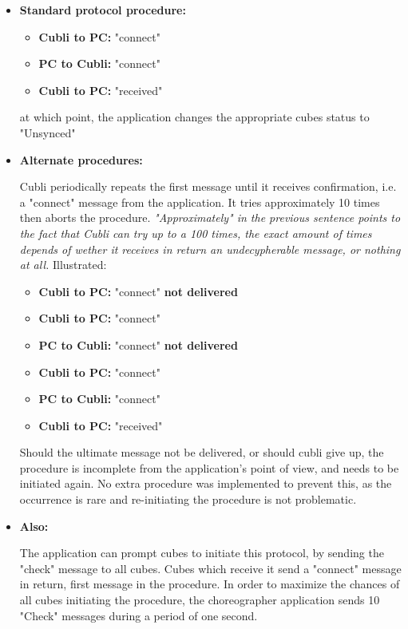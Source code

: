 \begin{itemize}
\item[] \textbf{Standard protocol procedure:}

\begin{itemize}
\item[] \textbf{Cubli to PC:} "connect"
\item[] \textbf{PC to Cubli:} "connect"
\item[] \textbf{Cubli to PC:} "received"
\end{itemize}

at which point, the application changes the appropriate cubes status to "Unsynced"\\

\item[] \textbf{Alternate procedures:}

Cubli periodically repeats the first message until it receives confirmation, i.e. a "connect" message from the application. It tries approximately 10 times then aborts the procedure. \textit{"Approximately" in the previous sentence points to the fact that Cubli can try up to a 100 times, the exact amount of times depends of wether it receives in return an undecypherable message, or nothing at all.} Illustrated:

\begin{itemize}
\item[] \textbf{Cubli to PC:} "connect" \textbf{not delivered}
\item[] \textbf{Cubli to PC:} "connect"
\item[] \textbf{PC to Cubli:} "connect" \textbf{not delivered}
\item[] \textbf{Cubli to PC:} "connect"
\item[] \textbf{PC to Cubli:} "connect" 
\item[] \textbf{Cubli to PC:} "received"
\end{itemize}

Should the ultimate message not be delivered, or should cubli give up, the procedure is incomplete from the application's point of view, and needs to be initiated again. No extra procedure was implemented to prevent this, as the occurrence is rare and re-initiating the procedure is not problematic.


\item[] \textbf{Also:}

The application can prompt cubes to initiate this protocol, by sending the "check" message to all cubes. Cubes which receive it send a "connect" message in return, first message in the procedure. In order to maximize the chances of all cubes initiating the procedure, the choreographer application sends 10 "Check" messages during a period of one second.


\end{itemize}

